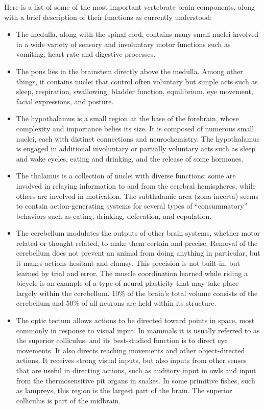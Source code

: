 \documentclass[]{book}
\providecommand{\tightlist}{%
  \setlength{\itemsep}{0pt}\setlength{\parskip}{0pt}}
\begin{document}
Here is a list of some of the most important vertebrate brain components, along with a brief description of their functions as currently understood:

\begin{itemize}
\tightlist
\item
  The medulla, along with the spinal cord, contains many small nuclei involved in a wide variety of sensory and involuntary motor functions such as vomiting, heart rate and digestive processes.
\item
  The pons lies in the brainstem directly above the medulla. Among other things, it contains nuclei that control often voluntary but simple acts such as sleep, respiration, swallowing, bladder function, equilibrium, eye movement, facial expressions, and posture.
\item
  The hypothalamus is a small region at the base of the forebrain, whose complexity and importance belies its size. It is composed of numerous small nuclei, each with distinct connections and neurochemistry. The hypothalamus is engaged in additional involuntary or partially voluntary acts such as sleep and wake cycles, eating and drinking, and the release of some hormones.
\item
  The thalamus is a collection of nuclei with diverse functions: some are involved in relaying information to and from the cerebral hemispheres, while others are involved in motivation. The subthalamic area (zona incerta) seems to contain action-generating systems for several types of ``consummatory'' behaviors such as eating, drinking, defecation, and copulation.
\item
  The cerebellum modulates the outputs of other brain systems, whether motor related or thought related, to make them certain and precise. Removal of the cerebellum does not prevent an animal from doing anything in particular, but it makes actions hesitant and clumsy. This precision is not built-in, but learned by trial and error. The muscle coordination learned while riding a bicycle is an example of a type of neural plasticity that may take place largely within the cerebellum. 10\% of the brain's total volume consists of the cerebellum and 50\% of all neurons are held within its structure.
\item
  The optic tectum allows actions to be directed toward points in space, most commonly in response to visual input. In mammals it is usually referred to as the superior colliculus, and its best-studied function is to direct eye movements. It also directs reaching movements and other object-directed actions. It receives strong visual inputs, but also inputs from other senses that are useful in directing actions, such as auditory input in owls and input from the thermosensitive pit organs in snakes. In some primitive fishes, such as lampreys, this region is the largest part of the brain. The superior colliculus is part of the midbrain.

\end{itemize}
\end{document}
